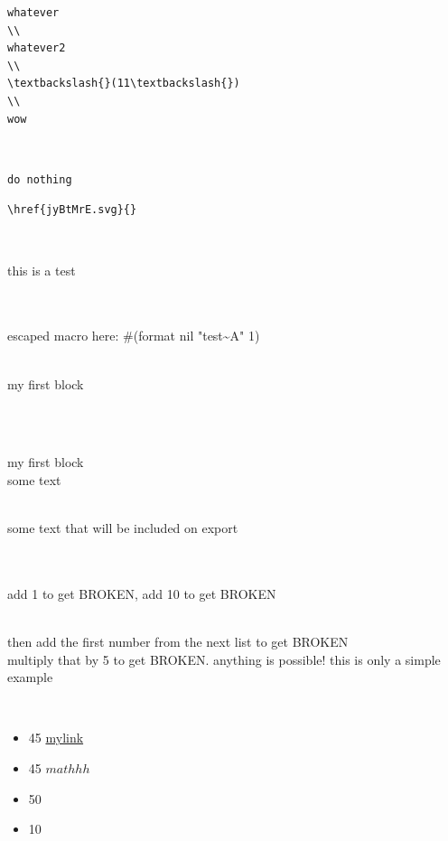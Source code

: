 \documentclass[11pt]{article}
\begin{document}
\begin{lstlisting}whatever
\\
whatever2
\\
\textbackslash{}(11\textbackslash{})
\\
wow\end{lstlisting}
\\
\begin{lstlisting}do nothing
\end{lstlisting}

\begin{lstlisting}\href{jyBtMrE.svg}{}\end{lstlisting}
\\
\begin{dummy}
  this is a test
\end{dummy}
\\

\\
escaped macro here: \#(format nil "test\textasciitilde{}A" 1)
\\
\begin{definition}
\\
my first block
\\
\end{definition}
\\
\begin{theorem}
\\
  my first block
\\
  some text
\\
  \begin{subtheorem}
\\
    some text that will be included on export
\\
  \end{subtheorem}\end{theorem}
\\

\\
add 1 to get BROKEN, add 10 to get BROKEN
\\
\begin{theorem}
\\
then add the first number from the next list to get BROKEN
\\
multiply that by 5 to get BROKEN. anything is possible! this is only a simple example
\\
\end{theorem}
\\
\begin{itemize}
\item  45 \href{mylink}{mylink}
\item  45 \(mathhh\)
\item  50
\item  10
\end{itemize}
\end{document}

